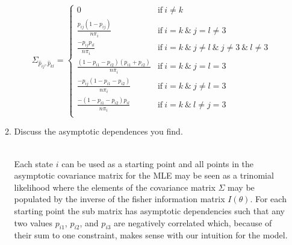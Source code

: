 \documentclass{article} %
\begin{document}
\begin{enumerate}
\begin{enumerate}
\begin{displaymath}
  \Sigma_{ \hat p_{ij}, \hat p_{kl}} = \left\{
    \begin{array}{lr}
      0 & \text{if} ~ i \neq k \\
      \frac{p_{ij}(1-p_{ij})}{n \pi_i} & \text{if} ~ i = k ~ \&  ~ j = l \neq 3 \\
      \frac{-p_{ij}p_{il}}{n \pi_i} & \text{if} ~ i = k ~ \&  ~ j \neq l ~ \& ~ j \neq 3 ~ \& ~ l \neq 3 \\
      \frac{(1-p_{i1}-p_{i2})(p_{i1}+p_{i2})} {n \pi_i} & \text{if} ~ i = k ~ \&  ~ j = l = 3 \\
      \frac{-p_{ij}(1-p_{i1}-p_{i2})} {n \pi_i} & \text{if} ~ i = k ~ \&  ~ j \neq l = 3 \\
      \frac{-(1-p_{i1}-p_{i2})p_{il}} {n \pi_i} & \text{if} ~ i = k ~ \&  ~ l \neq j = 3 \\
    \end{array}
  \right.
\end{displaymath}


  \item Discuss the asymptotic dependences you find.

~\\
Each state $i$ can be used as a starting point and all points in the
asymptotic covariance matrix for the MLE may be seen as a trinomial likelihood
where the elements of the covariance matrix $\Sigma$ may be populated by the
inverse of the fisher information matrix $I(\theta)$. For each starting point
the sub matrix has asymptotic dependencies such that any two values $p_{i1}$,
$p_{i2}$, and $p_{i3}$ are negatively correlated which, because of their sum to
one constraint, makes sense with our intuition for the model.
  \end{enumerate}
\end{enumerate}
\end{document}
